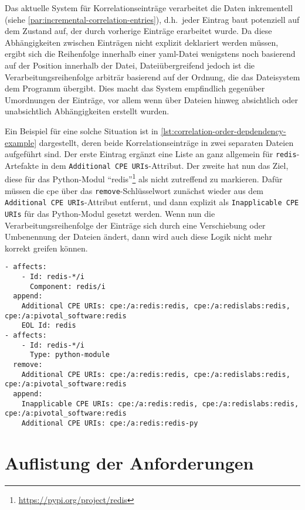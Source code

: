 Das aktuelle System für Korrelationseinträge verarbeitet die Daten inkrementell (siehe \autoref{par:incremental-correlation-entries}), d.h.\ jeder Eintrag baut potenziell auf dem Zustand auf, der durch vorherige Einträge erarbeitet wurde.
Da diese Abhängigkeiten zwischen Einträgen nicht explizit deklariert werden müssen, ergibt sich die Reihenfolge innerhalb einer \acrshort{yaml}-Datei wenigstens noch basierend auf der Position innerhalb der Datei, Dateiübergreifend jedoch ist die Verarbeitungsreihenfolge arbiträr basierend auf der Ordnung, die das Dateisystem dem Programm übergibt.
Dies macht das System empfindlich gegenüber Umordnungen der Einträge, vor allem wenn über Dateien hinweg absichtlich oder unabsichtlich Abhängigkeiten erstellt wurden.

Ein Beispiel für eine solche Situation ist in \autoref{lst:correlation-order-depdendency-example} dargestellt, deren beide Korrelationseinträge in zwei separaten Dateien aufgeführt sind.
Der erste Eintrag ergänzt eine Liste an  ganz allgemein für \texttt{redis}-Artefakte in dem \texttt{Additional CPE URIs}-Attribut.
Der zweite hat nun das Ziel, diese für das Python-Modul \enquote{redis}\footnote{\url{https://pypi.org/project/redis}} als nicht zutreffend zu markieren.
Dafür müssen die \acrshort{cpe} über das \texttt{remove}-Schlüsselwort zunächst wieder aus dem \texttt{Additional CPE URIs}-Attribut entfernt, und dann explizit als \texttt{Inapplicable CPE URIs} für das Python-Modul gesetzt werden.
Wenn nun die Verarbeitungsreihenfolge der Einträge sich durch eine Verschiebung oder Umbenennung der Dateien ändert, dann wird auch diese Logik nicht mehr korrekt greifen können.

\begin{lstlisting}[style=yaml,caption={Korrelationseinträge in zwei unterschiedlichen Dateien, die aufeinander aufbauen},label={lst:correlation-order-depdendency-example}]
- affects:
    - Id: redis-*/i
      Component: redis/i
  append:
    Additional CPE URIs: cpe:/a:redis:redis, cpe:/a:redislabs:redis, cpe:/a:pivotal_software:redis
    EOL Id: redis
- affects:
    - Id: redis-*/i
      Type: python-module
  remove:
    Additional CPE URIs: cpe:/a:redis:redis, cpe:/a:redislabs:redis, cpe:/a:pivotal_software:redis
  append:
    Inapplicable CPE URIs: cpe:/a:redis:redis, cpe:/a:redislabs:redis, cpe:/a:pivotal_software:redis
    Additional CPE URIs: cpe:/a:redis:redis-py
\end{lstlisting}


\section{Auflistung der Anforderungen}


